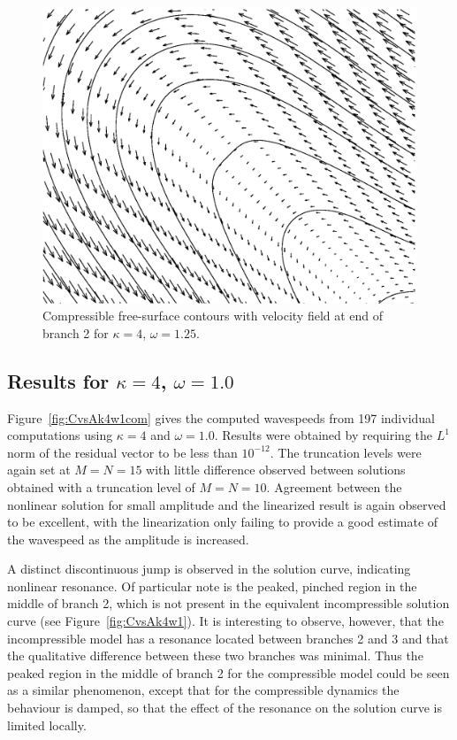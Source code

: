 \begin{figure}[htbp]
	\centering
		\includegraphics[scale=0.75]{IMAGES/comk4w125vecf.eps}
	\caption{Compressible free-surface contours with velocity field at end of branch 2 for $\kappa=4$, $\omega=1.25$.}
	\label{fig:comk4w125vecf}
\end{figure}

\subsection[Results for $\kappa=4$, $\omega=1.0$]{Results for \boldmath$\kappa=4$, $\omega=1.0$}
Figure~\ref{fig:CvsAk4w1com} gives the computed wavespeeds from 197 individual computations using $\kappa=4$ and $\omega=1.0$. Results were obtained by requiring the $L^1$ norm of the residual vector to be less than $10^{-12}$. The truncation levels were again set at $M=N=15$ with little difference observed between solutions obtained with a truncation level of $M=N=10$. Agreement between the nonlinear solution for small amplitude and the linearized result is again observed to be excellent, with the linearization only failing to provide a good estimate of the wavespeed as the amplitude is increased. 

A distinct discontinuous jump is observed in the solution curve, indicating nonlinear resonance. Of particular note is the peaked, pinched region in the middle of branch 2, which is not present in the equivalent incompressible solution curve (see Figure~\ref{fig:CvsAk4w1}). It is interesting to observe, however, that the incompressible model has a resonance located between branches 2 and 3 and that the qualitative difference between these two branches was minimal. Thus the peaked region in the middle of branch 2 for the compressible model could be seen as a similar phenomenon, except that for the compressible dynamics the behaviour is damped, so that the effect of the resonance on the solution curve is limited locally.


